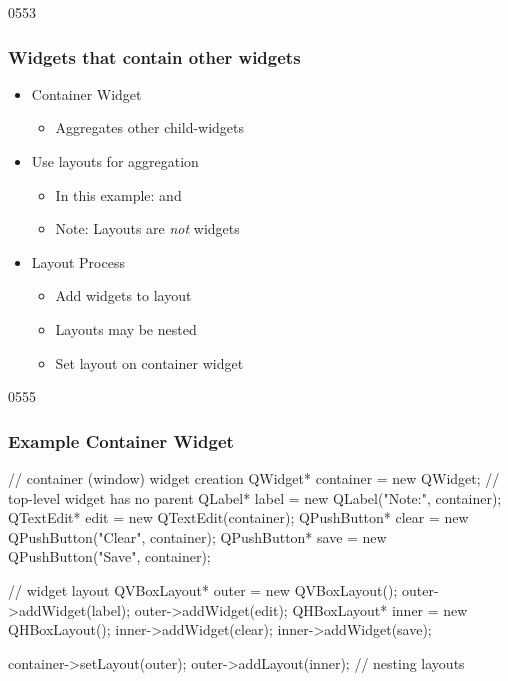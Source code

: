 \begin{slide}{0553}\frametitle{Widgets that contain other widgets}
  
  \begin{itemize}
  \item Container Widget
    \begin{itemize}
    \item Aggregates other child-widgets
    \end{itemize}\medskip

  \item Use layouts for aggregation
    \begin{itemize}
    \item In this example:  and \\ 
    \item Note: Layouts are \emph{not} widgets
    \end{itemize}\medskip

  \item Layout Process
    \begin{itemize}
    \item Add widgets to layout
    \item Layouts may be nested
    \item Set layout on container widget
    \end{itemize}
  \end{itemize}
\end{slide}

\begin{slide}[fragile]{0555}
  \frametitle{Example Container Widget}
  \begin{cpp}
// container (window) widget creation
QWidget* container = new QWidget; // top-level widget has no parent
QLabel* label = new QLabel("Note:", container);
QTextEdit* edit = new QTextEdit(container);
QPushButton* clear = new QPushButton("Clear", container);
QPushButton* save = new QPushButton("Save", container);
    \end{cpp} 
   \begin{cpp}
// widget layout
QVBoxLayout* outer = new QVBoxLayout();
outer->addWidget(label);
outer->addWidget(edit);
QHBoxLayout* inner = new QHBoxLayout();
inner->addWidget(clear);
inner->addWidget(save);
    \end{cpp} 
  \begin{cpp}
container->setLayout(outer);
outer->addLayout(inner); // nesting layouts
    \end{cpp}
\end{slide}
